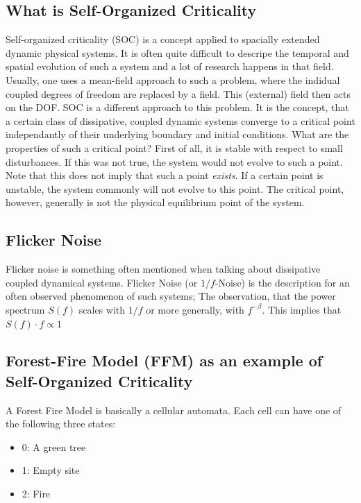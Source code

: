 \documentclass[11pt]{article}
\begin{document}
\subsection{What is Self-Organized Criticality}
Self-organized criticality (SOC) is a concept applied to spacially extended dynamic physical systems. It is often quite difficult to descripe the temporal and spatial evolution of such a system and a lot of research happens in that field. Usually, one uses a mean-field approach to such a problem, where the indidual coupled degrees of freedom are replaced by a field. This (external) field then acts on the DOF.  SOC is a different approach to this problem. It is the concept, that a certain class of dissipative, coupled dynamic systems converge to a critical point independantly of their underlying boundary and initial conditions. 
What are the properties of such a critical point? First of all, it is stable with respect to small disturbances. If this was not true, the system would not evolve to such a point. Note that this does not imply that such a point \emph{exists}. If a certain point is unstable, the system commonly will not evolve to this point. The critical point, however, generally is not the physical equilibrium point of the system.

\subsection{Flicker Noise}
Flicker noise is something often mentioned when talking about dissipative coupled dynamical systems. Flicker Noise (or $1/f$-Noise) is the description for an often observed phenomenon of such systems; The observation, that the power spectrum $S(f)$ scales with $1/f$ or more generally, with $f^{-\beta}$. This implies that $S(f)\cdot f \varpropto 1$



\subsection{Forest-Fire Model (FFM) as an example of Self-Organized Criticality}
A Forest Fire Model is basically a cellular automata. Each cell can have one of the following three states:
\begin{itemize}
  \item 0: A green tree
  \item 1: Empty site
  \item 2: Fire
\end{itemize}
\end{document}

